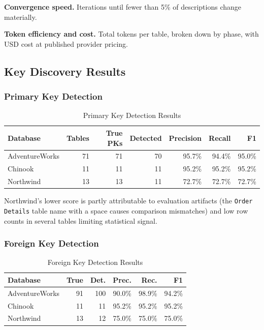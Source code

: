 \documentclass[sigconf, nonacm]{acmart}
\begin{document}
\textbf{Convergence speed.} Iterations until fewer than 5\% of descriptions change materially.

\textbf{Token efficiency and cost.} Total tokens per table, broken down by phase, with USD cost at published provider pricing.

\subsection{Key Discovery Results}

\subsubsection{Primary Key Detection}

\begin{table}[htbp]
\caption{Primary Key Detection Results}
\label{tab:pk}
\centering
\begin{tabular}{lrrrrrr}
\toprule
\textbf{Database} & \textbf{Tables} & \textbf{True PKs} & \textbf{Detected} & \textbf{Precision} & \textbf{Recall} & \textbf{F1} \\
\midrule
AdventureWorks & 71 & 71 & 70 & 95.7\% & 94.4\% & 95.0\% \\
Chinook & 11 & 11 & 11 & 95.2\% & 95.2\% & 95.2\% \\
Northwind & 13 & 13 & 11 & 72.7\% & 72.7\% & 72.7\% \\
\bottomrule
\end{tabular}
\end{table}

Northwind's lower score is partly attributable to evaluation artifacts (the \texttt{Order Details} table name with a space causes comparison mismatches) and low row counts in several tables limiting statistical signal.

\subsubsection{Foreign Key Detection}

\begin{table}[htbp]
\caption{Foreign Key Detection Results}
\label{tab:fk}
\begin{tabular}{lrrrrr}
\toprule
\textbf{Database} & \textbf{True} & \textbf{Det.} & \textbf{Prec.} & \textbf{Rec.} & \textbf{F1} \\
\midrule
AdventureWorks & 91 & 100 & 90.0\% & 98.9\% & 94.2\% \\
Chinook & 11 & 11 & 95.2\% & 95.2\% & 95.2\% \\
Northwind & 13 & 12 & 75.0\% & 75.0\% & 75.0\% \\
\bottomrule
\end{tabular}
\end{table}
\end{document}
